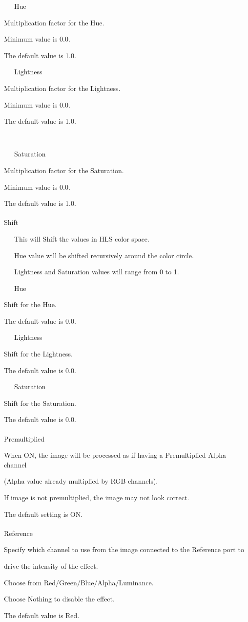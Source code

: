 \documentclass[a4paper,12pt]{article}
\begin{document}
\noindent \ \ \, Hue\par
Multiplication factor for the Hue.\par
Minimum value is 0.0.\par
The default value is 1.0.\par
\noindent \ \ \, Lightness\par
Multiplication factor for the Lightness.\par
Minimum value is 0.0.\par
The default value is 1.0.\par

\newpage

\thispagestyle{empty}

\ \vspace{-0.2em}
\par
\noindent \ \ \, Saturation\par
Multiplication factor for the Saturation.\par
Minimum value is 0.0.\par
The default value is 1.0.\\
\\
Shift\par
\noindent \ \ \, This will Shift the values in HLS color space.\par
\noindent \ \ \, Hue value will be shifted recursively around the color circle.\par
\noindent \ \ \, Lightness and Saturation values will range from 0 to 1.\\
\par
\noindent \ \ \, Hue\par
Shift for the Hue.\par
The default value is 0.0.\par
\noindent \ \ \, Lightness\par
Shift for the Lightness.\par
The default value is 0.0.\par
\noindent \ \ \, Saturation\par
Shift for the Saturation.\par
The default value is 0.0.\\
\\
Premultiplied\par
When ON, the image will be processed as if having a Premultiplied Alpha channel\par 
(Alpha value already multiplied by RGB channels).\par
If image is not premultiplied, the image may not look correct.\par
The default setting is ON.\\
\\
Reference\par
Specify which channel to use from the image connected to the Reference port to\par 
drive the intensity of the effect.\par
Choose from Red/Green/Blue/Alpha/Luminance.\par
Choose Nothing to disable the effect.\par
The default value is \textquotedbl Red\textquotedbl .
\end{document}
